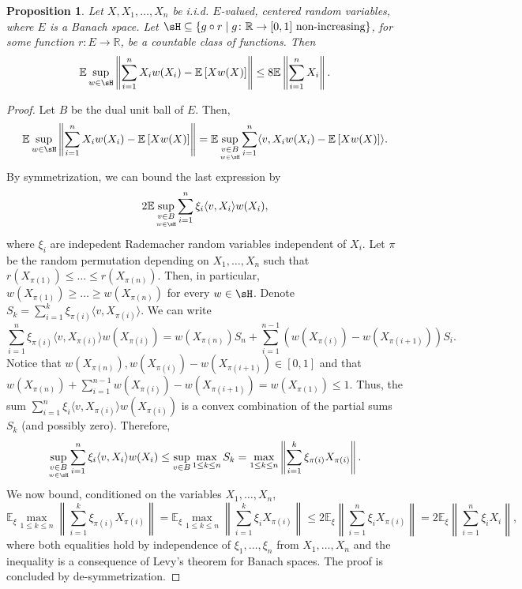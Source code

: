 \documentclass{article}
\theoremstyle{plain}
\newtheorem{proposition}[theorem]{Proposition}
\theoremstyle{definition}
\def\R{\mathbb{R}} %
\begin{document}
\begin{appendix}
\begin{proposition}\label{prop:shrinkage_emp}
  Let \( X,X_1,\ldots,X_n \) be i.i.d. \( E \)-valued, centered random variables, where \( E \) is a Banach space. Let \( \sH \subseteq \{g\circ r\mid g\colon \R \to [0,1] \text{ non-increasing}\}   \), for some function \( r\colon E \to \R \), be a countable class of functions. Then \[
    \mathbb{E}\sup_{w \in \sH}\left\|\sum_{i=1}^n X_i w(X_i) - \mathbb{E}\left[Xw(X)\right]\right\| \le 8\mathbb{E}\left\|\sum_{i=1}^n X_i\right\|.
  \] 
\end{proposition}
\begin{proof}
Let \( B \) be the dual unit ball of \( E \). Then, \[
  \mathbb{E}\sup_{w \in \sH}\left\|\sum_{i=1}^n X_i w(X_i) - \mathbb{E}\left[Xw(X)\right]\right\| =    \mathbb{E}\sup_{\underset{w \in \sH}{v \in B}}\sum_{i=1}^n \langle v, X_i w(X_i) - \mathbb{E}\left[Xw(X)\right]\rangle. 
\]   
By symmetrization, we can bound the last expression by \[
  2\mathbb{E}\sup_{\underset{w \in \sH}{v \in B}}\sum_{i=1}^n \xi_i \langle v, X_i\rangle w(X_i),
\]
where \( \xi_i \) are indepedent Rademacher random variables independent of \( X_i \). Let \( \pi \) be the random permutation depending on \( X_1,\ldots,X_n \) such that \( r(X_{\pi(1)})\le \ldots \le r(X_{\pi(n)}) \). Then, in particular, \( w(X_{\pi(1)}) \ge \ldots \ge  w(X_{\pi(n)}) \) for every \( w \in \sH \). Denote \( S_k = \sum_{i=1}^k \xi_{\pi(i)} \langle v, X_{\pi(i)} \rangle \). We can write \[
  \sum_{i=1}^n \xi_{\pi(i)} \langle v, X_{\pi(i)}\rangle w(X_{\pi(i)}) = w(X_{\pi(n)})S_n +  \sum_{i=1}^{n-1} (w(X_{\pi(i)}) - w(X_{\pi(i+1)}))S_i. 
\] 
Notice that \( w(X_{\pi(n)}),w(X_{\pi(i)})-w(X_{\pi(i+1)}) \in [0,1] \) and that \( w(X_{\pi(n)})+\sum_{i=1}^{n-1} w(X_{\pi(i)})-w(X_{\pi(i+1)})=w(X_{\pi(1)}) \le 1\). Thus, the sum \( \sum_{i=1}^n \xi_i \langle v, X_{\pi(i)} \rangle w(X_{\pi(i)}) \) is a convex combination of the partial sums \( S_k \) (and possibly zero). Therefore, \[
  \sup_{\underset{w \in \sH}{v \in B}}\sum_{i=1}^n \xi_i \langle v, X_i\rangle w(X_i) \le \sup_{v \in B}\max_{1\le k \le n} S_k=\max_{1\le k \le n}\left\lVert \sum_{i=1}^k \xi_{\pi(i)} X_{\pi(i)}\right\rVert. 
\]
We now bound, conditioned on the variables \( X_1,\ldots,X_n \), \[
  \mathbb{E}_{\xi }\max_{1\le k \le n}\left\|\sum_{i=1}^k\xi_{\pi(i)} X_{\pi(i)}\right\|=\mathbb{E}_{\xi }\max_{1\le k \le n}\left\|\sum_{i=1}^k\xi_i X_{\pi(i)}\right\| \le 2 \mathbb{E}_\xi \left\|\sum_{i=1}^n \xi_iX_{\pi(i)}\right\|=2 \mathbb{E}_\xi \left\|\sum_{i=1}^n \xi_iX_i\right\|,
\] 
where both equalities hold by independence of \( \xi_1,\ldots,\xi_n  \) from \( X_1,\ldots,X_n \) and the inequality is a consequence of Levy's theorem for Banach spaces. The proof is concluded by de-symmetrization.

\end{proof}
\end{appendix}
\end{document}
